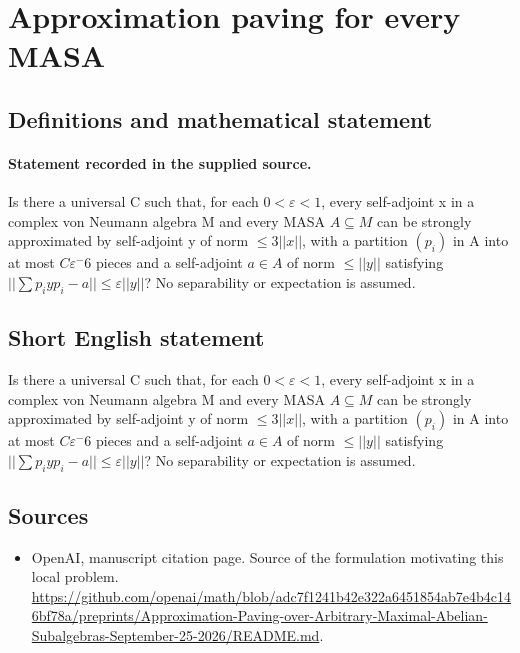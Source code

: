 \documentclass[11pt]{article}
\begin{document}
\section*{Approximation paving for every MASA}\label{30007295}
\subsection{Definitions and mathematical statement}
\paragraph{Statement recorded in the supplied source.}
Is there a universal C such that, for each $0<\varepsilon <1$, every self-adjoint x in a complex von Neumann algebra M and every MASA $A\subseteq M$ can be strongly approximated by self-adjoint y of norm $\leq 3||x||$, with a partition $(p_i)$ in A into at most $C\varepsilon ^-6$ pieces and a self-adjoint $a\in A$ of norm $\leq ||y||$ satisfying $||\sum p_iyp_i-a||\leq \varepsilon ||y||$? No separability or expectation is assumed.
\subsection{Short English statement}
Is there a universal C such that, for each $0<\varepsilon <1$, every self-adjoint x in a complex von Neumann algebra M and every MASA $A\subseteq M$ can be strongly approximated by self-adjoint y of norm $\leq 3||x||$, with a partition $(p_i)$ in A into at most $C\varepsilon ^-6$ pieces and a self-adjoint $a\in A$ of norm $\leq ||y||$ satisfying $||\sum p_iyp_i-a||\leq \varepsilon ||y||$? No separability or expectation is assumed.
\subsection{Sources}
\begin{itemize}
\item[S1] OpenAI, manuscript citation page. Source of the formulation motivating this local problem.
\url{https://github.com/openai/math/blob/adc7f1241b42e322a6451854ab7e4b4c146bf78a/preprints/Approximation-Paving-over-Arbitrary-Maximal-Abelian-Subalgebras-September-25-2026/README.md}.
\end{itemize}
\end{document}
